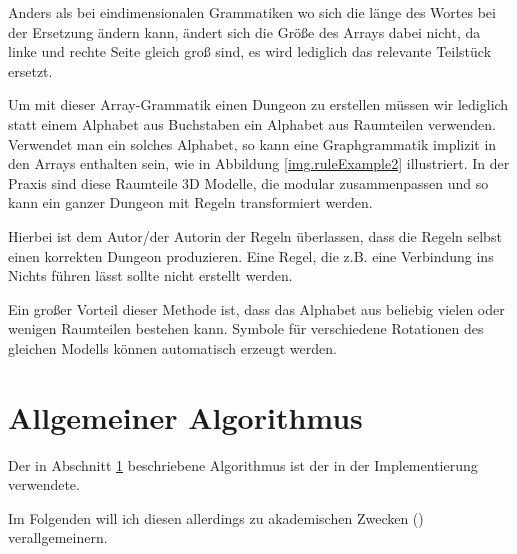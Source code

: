 

Anders als bei eindimensionalen Grammatiken wo sich die länge des Wortes bei der Ersetzung ändern kann, ändert sich die Größe des Arrays dabei nicht, da linke und rechte Seite gleich groß sind, es wird lediglich das relevante Teilstück ersetzt.


Um mit dieser Array-Grammatik einen Dungeon zu erstellen müssen wir lediglich statt einem Alphabet aus Buchstaben ein Alphabet aus Raumteilen verwenden. Verwendet man ein solches Alphabet, so kann eine Graphgrammatik implizit in den Arrays enthalten sein, wie in Abbildung \ref{img.ruleExample2} illustriert. In der Praxis sind diese Raumteile 3D Modelle, die modular zusammenpassen und so kann ein ganzer Dungeon mit Regeln transformiert werden.

Hierbei ist dem Autor/der Autorin der Regeln überlassen, dass die Regeln selbst einen korrekten Dungeon produzieren. Eine Regel, die z.B. eine Verbindung ins Nichts führen lässt sollte nicht erstellt werden. 

Ein großer Vorteil dieser Methode ist, dass das Alphabet aus beliebig vielen oder wenigen Raumteilen bestehen kann. Symbole für verschiedene Rotationen des gleichen Modells können automatisch erzeugt werden.



\section{Allgemeiner Algorithmus}\label{s.allgemeinerAlgorithmus}

Der in Abschnitt \ref{s.allgemeinerAlgorithmus} beschriebene Algorithmus ist der in der Implementierung verwendete. 

Im Folgenden will ich diesen allerdings zu akademischen Zwecken () verallgemeinern.

